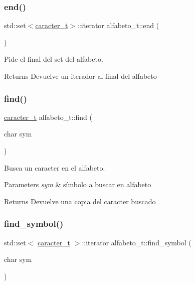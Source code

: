 \subsubsection{\texorpdfstring{end()}{end()}}
{\footnotesize\ttfamily std\+::set$<$\hyperlink{classcaracter__t}{caracter\+\_\+t}$>$\+::iterator alfabeto\+\_\+t\+::end (\begin{DoxyParamCaption}{ }\end{DoxyParamCaption})\hspace{0.3cm}{\ttfamily [inline]}}



Pide el final del set del alfabeto. 

\begin{DoxyReturn}{Returns}
Devuelve un iterador al final del alfabeto 
\end{DoxyReturn}
\mbox{\label{classalfabeto__t_aca1176f138d0641e5dc46b6bc87ddbce}} 
\subsubsection{\texorpdfstring{find()}{find()}}
{\footnotesize\ttfamily \hyperlink{classcaracter__t}{caracter\+\_\+t} alfabeto\+\_\+t\+::find (\begin{DoxyParamCaption}\item[{char}]{sym }\end{DoxyParamCaption})}



Busca un caracter en el alfabeto. 


\begin{DoxyParams}{Parameters}
{\em sym} & símbolo a buscar en alfabeto \\
\hline
\end{DoxyParams}
\begin{DoxyReturn}{Returns}
Devuelve una copia del caracter buscado 
\end{DoxyReturn}
\mbox{\label{classalfabeto__t_a161c66c238d75e8ae563f273315ae377}} 
\subsubsection{\texorpdfstring{find\+\_\+symbol()}{find\_symbol()}}
{\footnotesize\ttfamily std\+::set$<$ \hyperlink{classcaracter__t}{caracter\+\_\+t} $>$\+::iterator alfabeto\+\_\+t\+::find\+\_\+symbol (\begin{DoxyParamCaption}\item[{char}]{sym }\end{DoxyParamCaption})}



